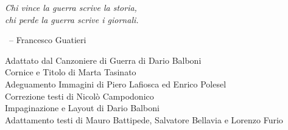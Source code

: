 \begin{myquote}\it
  Chi vince la guerra scrive la storia,\\
  chi perde la guerra scrive i giornali.
  
  {~\hfill\normalfont -- Francesco Guatieri}
\end{myquote}

\vfill

\begin{adjustwidth}{\sectionnumlen}{}\fontsize{10}{15}\selectfont
  Adattato dal Canzoniere di Guerra di Dario Balboni\\

  Cornice e Titolo di Marta Tasinato\\
  Adeguamento Immagini di Piero Lafiosca ed Enrico Polesel\\
  Correzione testi di Nicolò Campodonico\\
  Impaginazione e Layout di Dario Balboni\\

  Adattamento testi di Mauro Battipede, Salvatore Bellavia e Lorenzo Furio\\
\end{adjustwidth}
\clearpage

